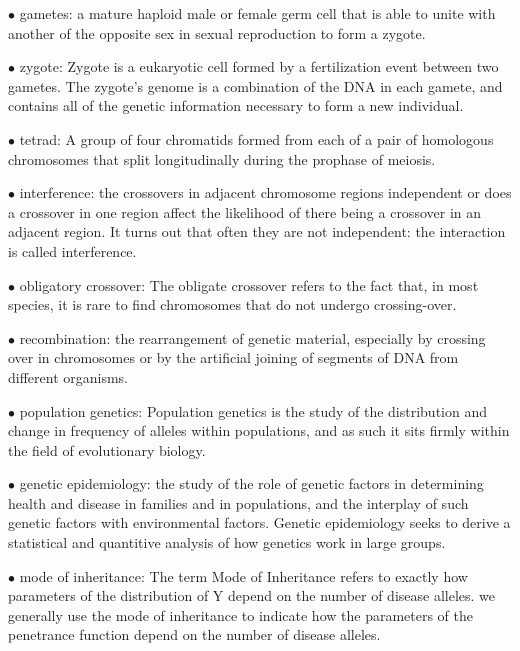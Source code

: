 \documentclass{article}
\begin{document}
\vspace{0.1in}
$\bullet$ gametes:
a mature haploid male or female germ cell that is able to unite with another of the opposite sex in sexual reproduction to form a zygote.

\vspace{0.1in}
$\bullet$ zygote:
 Zygote is a eukaryotic cell formed by a fertilization event between two gametes. The zygote's genome is a combination of the DNA in each gamete, and contains all of the genetic information necessary to form a new individual.

\vspace{0.1in}
$\bullet$ tetrad:
A group of four chromatids formed from each of a pair of homologous chromosomes that split longitudinally during the prophase of meiosis.

\vspace{0.1in}
$\bullet$ interference:
 the crossovers in adjacent chromosome regions independent or does a crossover in one region affect the likelihood of there being a crossover in an adjacent region. It turns out that often they are not independent: the interaction is called interference.

\vspace{0.1in}
$\bullet$ obligatory crossover:
The obligate crossover refers to the fact that, in most species, it is rare to find chromosomes that do not undergo crossing-over.

\vspace{0.1in}
$\bullet$ recombination:
the rearrangement of genetic material, especially by crossing over in chromosomes or by the artificial joining of segments of DNA from different organisms.

\vspace{0.1in}
$\bullet$ population genetics:
Population genetics is the study of the distribution and change in frequency of alleles within populations, and as such it sits firmly within the field of evolutionary biology.

\vspace{0.1in}
$\bullet$ genetic epidemiology:
 the study of the role of genetic factors in determining health and disease in families and in populations, and the interplay of such genetic factors with environmental factors. Genetic epidemiology seeks to derive a statistical and quantitive analysis of how genetics work in large groups.

\vspace{0.1in}
$\bullet$ mode of inheritance:
The term Mode of Inheritance refers to exactly how parameters of the distribution of Y depend on the number of disease alleles.
we generally use the mode of inheritance to indicate how the parameters of the penetrance function depend on the number of disease alleles. 
\end{document}
